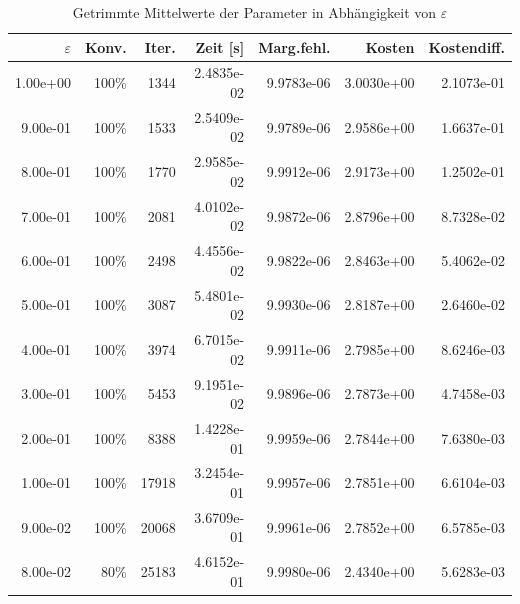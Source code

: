 \begin{table}[htbp]
\caption{Getrimmte Mittelwerte der Parameter in Abhängigkeit von $\varepsilon$}
\label{tab:Parametertest128_tol1e-05}
\small
\centering
{}
\begin{tabular}{rrrrrrr}
\toprule
$\varepsilon$ & Konv. & Iter. & Zeit [s] & Marg.fehl. & Kosten & Kostendiff. \\
\midrule
1.00e+00 & 100\% & 1344 & 2.4835e-02 & 9.9783e-06 & 3.0030e+00 & 2.1073e-01 \\
9.00e-01 & 100\% & 1533 & 2.5409e-02 & 9.9789e-06 & 2.9586e+00 & 1.6637e-01 \\
8.00e-01 & 100\% & 1770 & 2.9585e-02 & 9.9912e-06 & 2.9173e+00 & 1.2502e-01 \\
7.00e-01 & 100\% & 2081 & 4.0102e-02 & 9.9872e-06 & 2.8796e+00 & 8.7328e-02 \\
6.00e-01 & 100\% & 2498 & 4.4556e-02 & 9.9822e-06 & 2.8463e+00 & 5.4062e-02 \\
5.00e-01 & 100\% & 3087 & 5.4801e-02 & 9.9930e-06 & 2.8187e+00 & 2.6460e-02 \\
4.00e-01 & 100\% & 3974 & 6.7015e-02 & 9.9911e-06 & 2.7985e+00 & 8.6246e-03 \\
3.00e-01 & 100\% & 5453 & 9.1951e-02 & 9.9896e-06 & 2.7873e+00 & 4.7458e-03 \\
2.00e-01 & 100\% & 8388 & 1.4228e-01 & 9.9959e-06 & 2.7844e+00 & 7.6380e-03 \\
1.00e-01 & 100\% & 17918 & 3.2454e-01 & 9.9957e-06 & 2.7851e+00 & 6.6104e-03 \\
9.00e-02 & 100\% & 20068 & 3.6709e-01 & 9.9961e-06 & 2.7852e+00 & 6.5785e-03 \\
8.00e-02 & 80\% & 25183 & 4.6152e-01 & 9.9980e-06 & 2.4340e+00 & 5.6283e-03 \\
\bottomrule
\end{tabular}
\end{table}
